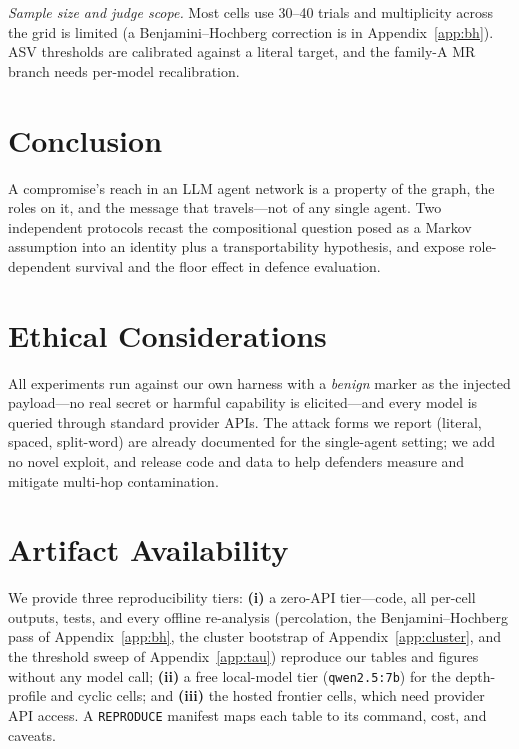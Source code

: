 \documentclass[sigconf,anonymous]{aamas}
\begin{document}
\emph{Sample size and judge scope.} Most cells use 30--40 trials and multiplicity
across the grid is limited (a Benjamini--Hochberg correction is in
Appendix~\ref{app:bh}). ASV thresholds are calibrated against a literal target,
and the family-A MR branch needs per-model recalibration.


\section{Conclusion}
\label{sec:conclusion}

A compromise's reach in an LLM agent network is a property of the graph, the roles on
it, and the message that travels---not of any single agent. Two independent protocols
recast the compositional question posed as a Markov assumption into an identity plus a
transportability hypothesis, and expose role-dependent survival and the floor effect
in defence evaluation.

\section*{Ethical Considerations}
All experiments run against our own harness with a \emph{benign} marker as the
injected payload---no real secret or harmful capability is elicited---and every
model is queried through standard provider APIs. The attack forms we report
(literal, spaced, split-word) are already documented for the single-agent setting;
we add no novel exploit, and release code and data to help defenders measure and
mitigate multi-hop contamination.

\section*{Artifact Availability}
We provide three reproducibility tiers: \textbf{(i)} a zero-API tier---code, all
per-cell outputs, tests, and every offline re-analysis (percolation, the
Benjamini--Hochberg pass of Appendix~\ref{app:bh}, the cluster bootstrap of
Appendix~\ref{app:cluster}, and the threshold sweep of Appendix~\ref{app:tau})
reproduce our tables and figures without any model call; \textbf{(ii)} a free
local-model tier (\texttt{qwen2.5:7b}) for the depth-profile and cyclic cells; and
\textbf{(iii)} the hosted frontier cells, which need provider API access. A
\texttt{REPRODUCE} manifest maps each table to its command, cost, and caveats.
\end{document}
